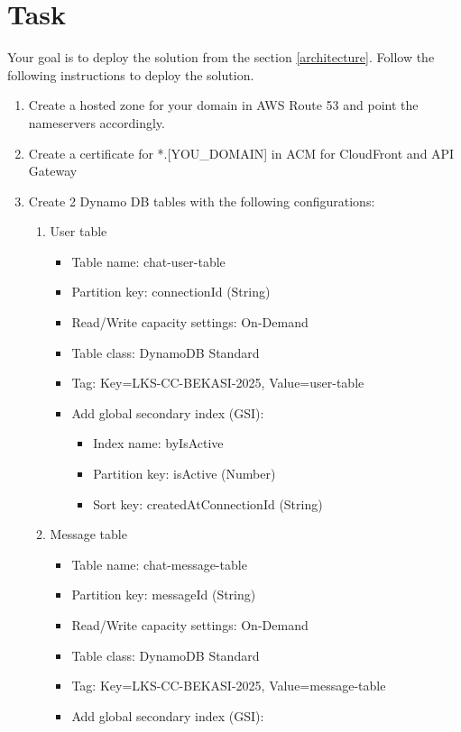 \documentclass{article}
\begin{document}
\section{Task}
Your goal is to deploy the solution from the section \ref{architecture}. Follow the following instructions to deploy the solution.
\begin{enumerate}
\item \label{create_r53} Create a hosted zone for your domain in AWS Route 53 and point the nameservers accordingly.
\item \label{create_acm} Create a certificate for *.[YOU\_DOMAIN] in ACM for CloudFront and API Gateway
\item \label{create_ddb} Create 2 Dynamo DB tables with the following configurations:
  \begin{enumerate}
    \item User table
    \begin{itemize}
      \item Table name: chat-user-table
      \item Partition key: connectionId (String)
      \item Read/Write capacity settings: On-Demand
      \item Table class: DynamoDB Standard
      \item Tag: Key=LKS-CC-BEKASI-2025, Value=user-table
      \item Add global secondary index (GSI):
      \begin{itemize}
        \item Index name: byIsActive
        \item Partition key: isActive (Number)
        \item Sort key: createdAtConnectionId (String)
      \end{itemize}
    \end{itemize}
    \item Message table
    \begin{itemize}
      \item Table name: chat-message-table
      \item Partition key: messageId (String)
      \item Read/Write capacity settings: On-Demand
      \item Table class: DynamoDB Standard
      \item Tag: Key=LKS-CC-BEKASI-2025, Value=message-table
      \item Add global secondary index (GSI):
      \begin{itemize}

\end{itemize}
\end{itemize}
\end{enumerate}
\end{enumerate}
\end{document}
